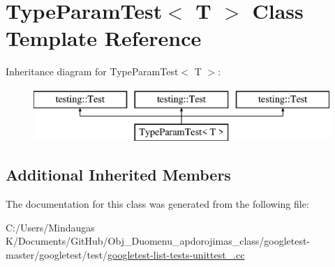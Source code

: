 \hypertarget{class_type_param_test}{}\section{Type\+Param\+Test$<$ T $>$ Class Template Reference}
\label{class_type_param_test}
Inheritance diagram for Type\+Param\+Test$<$ T $>$\+:\begin{figure}[H]
\begin{center}
\leavevmode
\includegraphics[height=2.000000cm]{d3/d44/class_type_param_test}
\end{center}
\end{figure}
\subsection*{Additional Inherited Members}


The documentation for this class was generated from the following file\+:\begin{DoxyCompactItemize}
\item 
C\+:/\+Users/\+Mindaugas K/\+Documents/\+Git\+Hub/\+Obj\+\_\+\+Duomenu\+\_\+apdorojimas\+\_\+class/googletest-\/master/googletest/test/\mbox{\hyperlink{googletest-master_2googletest_2test_2googletest-list-tests-unittest___8cc}{googletest-\/list-\/tests-\/unittest\+\_\+.\+cc}}\end{DoxyCompactItemize}
